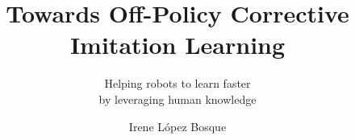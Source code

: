 \documentclass{layout/tudelft-report}
\begin{document}
\frontmatter

\title{Towards Off-Policy Corrective Imitation Learning}
\subtitle{Helping robots to learn faster \\ by leveraging human knowledge} %
\author{Irene López Bosque}
\subject{Master Thesis}


\makecover






%

\tableofcontents

%

\mainmatter














\setcounter{biburlnumpenalty}{7000}
\setcounter{biburllcpenalty}{7000}
\setcounter{biburlucpenalty}{7000}

\printbibliography[title=References]

\appendix




\end{document}
